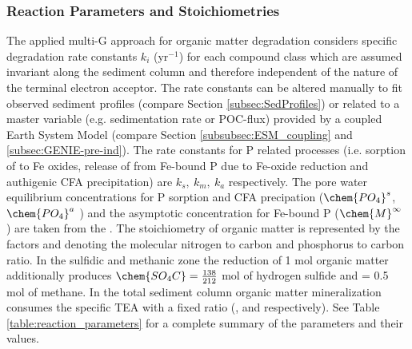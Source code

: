 \documentclass[gmd, manuscript]{copernicus}
\begin{document}
\subsubsection {Reaction Parameters and Stoichiometries}
The applied multi-G approach for organic matter degradation considers specific degradation rate constants $k_i$ (yr$^{-1}$) for each compound class 
which are assumed invariant along the sediment column and therefore independent of the nature of the terminal electron acceptor. The rate constants can be 
altered manually to fit observed sediment profiles (compare Section \ref{subsec:SedProfiles}) or related to a master variable 
(e.g. sedimentation rate or POC-flux) provided by a coupled Earth System Model (compare Section \ref{subsubsec:ESM_coupling} and \ref{subsec:GENIE-pre-ind}). 
The rate constants for P related processes (i.e. sorption of  to Fe oxides, release of  from Fe-bound P 
due to Fe-oxide reduction and authigenic CFA precipitation) are $k_s,\ k_m,\ k_a$ respectively. 
The pore water equilibrium concentrations for P sorption and CFA precipation ($\chem{PO_4}^s$, $\chem{PO_4}^a$ ) and the asymptotic concentration for Fe-bound P ($\chem{M}^\infty$ ) 
are taken from the \citet{caroline_p_slomp_key_1996}. 
The stoichiometry of organic matter is represented by the factors  and  denoting the molecular nitrogen to carbon and phosphorus to carbon ratio. 
In the sulfidic and methanic zone the 
reduction of 1 mol organic matter additionally produces $\chem{SO_4C}=\frac{138}{212}$ mol of hydrogen sulfide and  = 0.5 mol of methane. 
In the total sediment column organic matter mineralization consumes the specific TEA with a fixed ratio (,  and  respectively). 
See Table \ref{table:reaction_parameters} for a complete summary of the parameters and their values.
\end{document}

